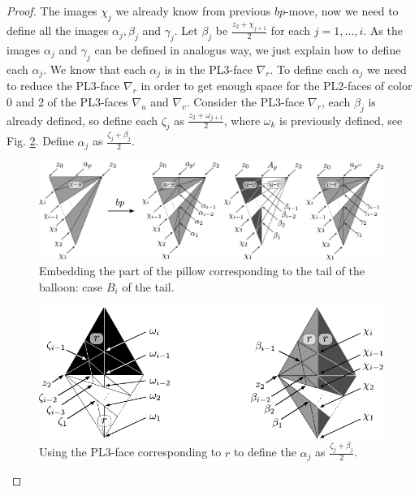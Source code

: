 \begin{proof}
The images $\chi_j$ we already know from previous $bp$-move, now we need to define all the images
$\alpha_j, \beta_j$ and $\gamma_j.$
Let $\beta_j$ be $\frac{z_2+\chi_{j+1}}{2}$ 
for each $j=1,\ldots, i$.
As the images $\alpha_j$ and $\gamma_j$ can be defined in analogus way, we just explain how to define each $\alpha_j$.
We know that each $\alpha_j$ is in the PL3-face $\nabla_r$. To 
define each $\alpha_j$ we need 
to reduce the PL3-face $\nabla_r$
in order to get enough space for the PL2-faces of color 0 and 2 of the PL3-faces $\nabla_u$ and $\nabla_v$.
Consider the PL3-face $\nabla_r$, each $\beta_j$ is already defined, so 
define each $\zeta_j$ as $\frac{z_2+\omega_{j+1}}{2}$, where $\omega_k$ is previously defined, %
 see Fig. \ref{fig:nextdual3}. Define $\alpha_j$ as $\frac{\zeta_j+\beta_j}{2}$. 

\begin{figure}[!htb] 
\begin{center}
\includegraphics[width=14cm]{A.figs/3d3.pdf}
\caption{Embedding the part of the pillow corresponding to the tail of the balloon: case $B_i$ of the tail.}
\label{fig:3d3}
\end{center}
\end{figure}

\begin{figure}[!htb] 
\begin{center}
\includegraphics[scale=0.8]{A.figs/nextdual3.pdf}
\caption{Using the PL3-face corresponding to $r$ to define the $\alpha_j$ as $\frac{\zeta_j+\beta_j}{2}$.}
\label{fig:nextdual3}
\end{center}
\end{figure}



\end{proof}
